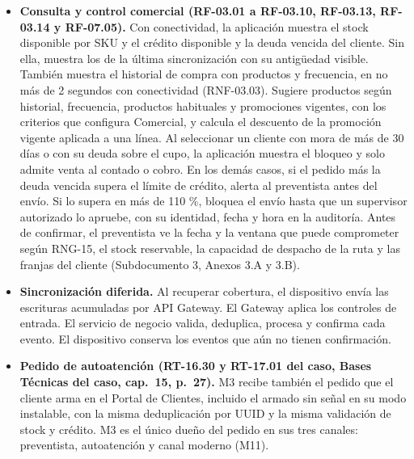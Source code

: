 \begin{itemize}
\item \textbf{Consulta y control comercial (RF-03.01 a RF-03.10, RF-03.13, RF-03.14 y RF-07.05).} Con conectividad, la aplicación muestra el stock disponible por SKU y el crédito disponible y la deuda vencida del cliente. Sin ella, muestra los de la última sincronización con su antigüedad visible. También muestra el historial de compra con productos y frecuencia, en no más de 2 segundos con conectividad (RNF-03.03). Sugiere productos según historial, frecuencia, productos habituales y promociones vigentes, con los criterios que configura Comercial, y calcula el descuento de la promoción vigente aplicada a una línea. Al seleccionar un cliente con mora de más de 30 días o con su deuda sobre el cupo, la aplicación muestra el bloqueo y solo admite venta al contado o cobro. En los demás casos, si el pedido más la deuda vencida supera el límite de crédito, alerta al preventista antes del envío. Si lo supera en más de 110 \%, bloquea el envío hasta que un supervisor autorizado lo apruebe, con su identidad, fecha y hora en la auditoría. Antes de confirmar, el preventista ve la fecha y la ventana que puede comprometer según RNG-15, el stock reservable, la capacidad de despacho de la ruta y las franjas del cliente (Subdocumento 3, Anexos 3.A y 3.B).
  \item \textbf{Sincronización diferida.} Al recuperar cobertura, el dispositivo envía las escrituras acumuladas por API Gateway. El Gateway aplica los controles de entrada. El servicio de negocio valida, deduplica, procesa y confirma cada evento. El dispositivo conserva los eventos que aún no tienen confirmación.
  \item \textbf{Pedido de autoatención (RT-16.30 y RT-17.01 del caso, Bases Técnicas del caso, cap.~15, p.~27).} M3 recibe también el pedido que el cliente arma en el Portal de Clientes, incluido el armado sin señal en su modo instalable, con la misma deduplicación por UUID y la misma validación de stock y crédito. M3 es el único dueño del pedido en sus tres canales: preventista, autoatención y canal moderno (M11).
\end{itemize}

